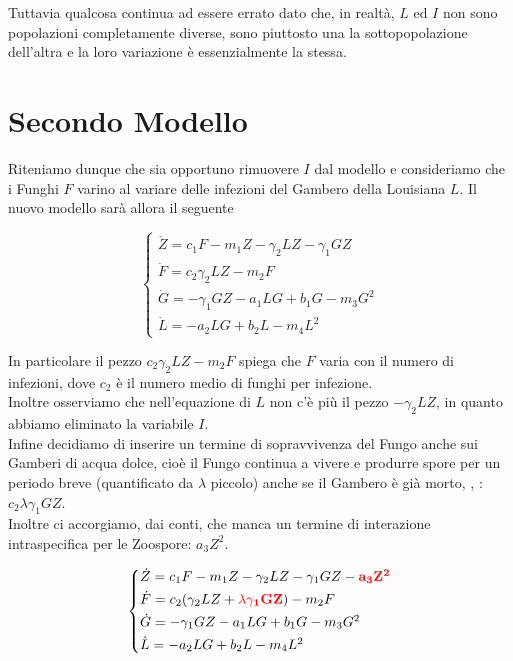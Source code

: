 \documentclass[12pt,a4paper]{article}
\numberwithin{theorem}{section}
\numberwithin{definition}{section}
\numberwithin{example}{section}
\newcommand{\deftitle}[1]{{\color{red}\bf{#1}\color{black}}}
\begin{document}
Tuttavia qualcosa continua ad essere errato dato che, in realtà, $L$ ed $I$ non sono popolazioni completamente diverse, sono piuttosto una la sottopopolazione dell'altra e la loro variazione è essenzialmente la stessa.


\section{Secondo Modello}
Riteniamo dunque che sia opportuno rimuovere $I$ dal modello e consideriamo che i Funghi $F$ varino al variare delle infezioni del Gambero della Louisiana $L$. Il nuovo modello sarà allora il seguente

$$\begin{cases*}
	\dot Z= c_1F-m_1 Z -\gamma_2 LZ-\gamma_1GZ \\
	\dot F= c_2 \gamma_2LZ  - m_2 F \\
	\dot G= -\gamma_1 GZ - a_1 LG+b_1 G -m_3 G^2 \\
	\dot L=  -a_2LG+b_2 L -m_4 L^2 
\end{cases*}$$

\smallskip
In particolare il pezzo $c_2 \gamma_2LZ  - m_2 F$ spiega che $F$ varia con il numero di infezioni, dove $c_2$ è il numero medio di funghi per infezione. \\
Inoltre osserviamo che nell'equazione di $L$ non c'è più il pezzo $-\gamma_2 LZ$, in quanto abbiamo eliminato la variabile $I$. \\
Infine decidiamo di inserire un termine di sopravvivenza del Fungo anche sui Gamberi di acqua dolce, cioè il Fungo continua a vivere e produrre spore per un periodo breve (quantificato da $\lambda$ piccolo) anche se il Gambero è già morto, \cite{strand2012monitoring}, \cite{makkonen2013timing}: $c_2 \lambda \gamma_1 GZ$. \\
Inoltre ci accorgiamo, dai conti, che manca un termine di interazione intraspecifica per le Zoospore: $a_3 Z^2$.

$$\begin{cases*}
    \dot Z= c_1F-m_1 Z -\gamma_2 LZ-\gamma_1GZ - \deftitle{a_3 Z^2}  \\
    \dot F= c_2(\gamma_2LZ  + \deftitle{\lambda \gamma_1 GZ})- m_2 F \\
    \dot G= -\gamma_1 GZ - a_1 LG+b_1 G -m_3 G^2 \\
    \dot L= -a_2LG+b_2 L -m_4 L^2
\end{cases*}$$
\end{document}
